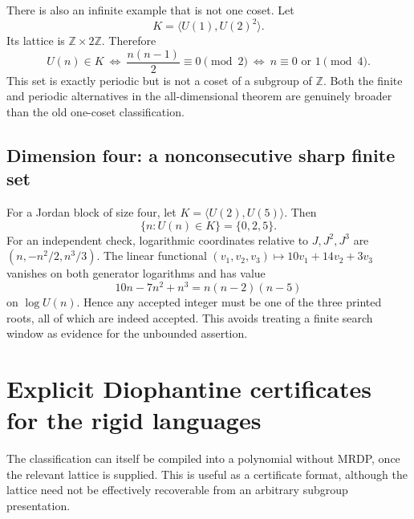 \documentclass[11pt,letterpaper]{article}
\theoremstyle{definition}
\theoremstyle{remark}
\newcommand{\Z}{\mathbb Z}
\begin{document}
There is also an infinite example that is not one coset. Let
\[
 K=\langle U(1),U(2)^2\rangle.
\]
Its lattice is $\Z\times2\Z$. Therefore
\[
 U(n)\in K
 \ \Longleftrightarrow\ \frac{n(n-1)}2\equiv0\pmod2
 \ \Longleftrightarrow\ n\equiv0\text{ or }1\pmod4.
\]
This set is exactly periodic but is not a coset of a subgroup of $\Z$. Both the finite and periodic alternatives in the all-dimensional theorem are genuinely broader than the old one-coset classification.

\subsection{Dimension four: a nonconsecutive sharp finite set}
For a Jordan block of size four, let $K=\langle U(2),U(5)\rangle$. Then
\[
 \{n:U(n)\in K\}=\{0,2,5\}.
\]
For an independent check, logarithmic coordinates relative to $J,J^2,J^3$ are $(n,-n^2/2,n^3/3)$. The linear functional $(v_1,v_2,v_3)\mapsto10v_1+14v_2+3v_3$ vanishes on both generator logarithms and has value
\[
 10n-7n^2+n^3=n(n-2)(n-5)
\]
on $\log U(n)$. Hence any accepted integer must be one of the three printed roots, all of which are indeed accepted. This avoids treating a finite search window as evidence for the unbounded assertion.

\section{Explicit Diophantine certificates for the rigid languages}\label{gts:ai:sec:certificates}
The classification can itself be compiled into a polynomial without MRDP, once the relevant lattice is supplied. This is useful as a certificate format, although the lattice need not be effectively recoverable from an arbitrary subgroup presentation.
\end{document}
